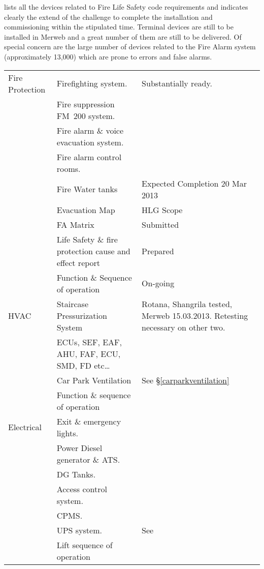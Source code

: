  lists all the devices related to Fire Life Safety code requirements and indicates clearly the extend of the challenge to complete the installation and commissioning within the stipulated time. Terminal devices are still to be installed in Merweb and a great number of them are still to be delivered. Of special concern are the large number of devices related to the Fire Alarm system (approximately 13,000) which are prone to errors and false alarms.




\medskip

\label{cdd}
{\small\RaggedRight
\begin{longtable}{p{2.3cm}p{4.2cm}p{4.2cm}}

\toprule
Fire Protection    &Firefighting system.  & Substantially ready.\\
    &Fire suppression FM~200 system. & \\
	&Fire alarm \& voice evacuation system. &\\
	&Fire alarm control rooms. &\\
	&Fire Water tanks & Expected Completion 20 Mar 2013\\
	&Evacuation Map & HLG Scope\\
	&FA Matrix & Submitted\\
	&Life Safety \& fire protection cause and 
         effect report & Prepared\\
	&Function \& Sequence of operation & On-going\\
\midrule

HVAC	&Staircase Pressurization System & Rotana, Shangrila tested, Merweb 15.03.2013. Retesting necessary on other two.\\
	&ECUs, SEF, EAF, AHU, FAF, ECU, SMD, FD etc… &\\
	&Car Park Ventilation & See \S\ref{carparkventilation}\\
	&Function \& sequence of operation &\\
\midrule


Electrical	&Exit \& emergency lights. &\\
	&Power Diesel generator \& ATS. &\\
	&DG Tanks. &\\
	&Access control system.  &\\
	&CPMS. &\\
	&UPS system. & See {ups}\\
	&Lift sequence of operation &\\
\midrule


\end{longtable}}
